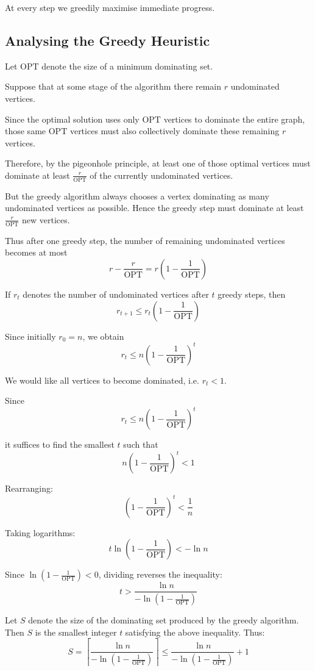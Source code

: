 At every step we greedily maximise immediate progress.

\subsection*{Analysing the Greedy Heuristic}
Let \(\mathrm{OPT}\) denote the size of a minimum dominating set.

Suppose that at some stage of the algorithm there remain \(r\) undominated vertices.

Since the optimal solution uses only \(\mathrm{OPT}\) vertices to dominate the entire graph, those same \(\mathrm{OPT}\) vertices must also collectively dominate these remaining \(r\) vertices.

Therefore, by the pigeonhole principle, at least one of those optimal vertices must dominate at least \(\frac{r}{\mathrm{OPT}}\) of the currently undominated vertices.

But the greedy algorithm always chooses a vertex dominating as many undominated vertices as possible. Hence the greedy step must dominate at least \(\frac{r}{\mathrm{OPT}}\) new vertices.

Thus after one greedy step, the number of remaining undominated vertices becomes at most
\[
r-\frac{r}{\mathrm{OPT}}
=
r\left(1-\frac{1}{\mathrm{OPT}}\right)
\]

If \(r_t\) denotes the number of undominated vertices after \(t\) greedy steps, then
\[
r_{t+1}
\le
r_t\left(1-\frac1{\mathrm{OPT}}\right)
\]

Since initially \(r_0=n\), we obtain
\[
r_t
\le
n\left(1-\frac1{\mathrm{OPT}}\right)^t
\]

We would like all vertices to become dominated, i.e. \(r_t<1\).

Since
\[
r_t
\le
n\left(1-\frac1{\mathrm{OPT}}\right)^t
\]

it suffices to find the smallest \(t\) such that
\[
n\left(1-\frac1{\mathrm{OPT}}\right)^t<1
\]

Rearranging:
\[
\left(1-\frac1{\mathrm{OPT}}\right)^t<\frac1n
\]

Taking logarithms:
\[
t\ln\left(1-\frac1{\mathrm{OPT}}\right)<-\ln n
\]

Since \(\ln(1-\frac1{\mathrm{OPT}})<0\), dividing reverses the inequality:
\[
t>
\frac{\ln n}{
-\ln\left(1-\frac1{\mathrm{OPT}}\right)
}
\]

Let \(S\) denote the size of the dominating set produced by the greedy algorithm. Then \(S\) is the smallest integer \(t\) satisfying the above inequality. Thus:
\[
S=
\left\lceil
\frac{\ln n}{
-\ln\left(1-\frac{1}{\mathrm{OPT}}\right)
}
\right\rceil
\le
\frac{\ln n}{
-\ln\left(1-\frac{1}{\mathrm{OPT}}\right)
}
+1
\]


